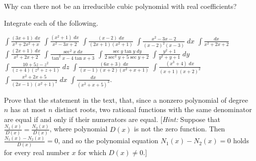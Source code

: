\begin{exercises}
Why can there not be an irreducible cubic
polynomial with real coefficients?

Integrate each of the following.
\begin{exenum}
\x
$\int \frac{(3x+1)\;dx}{x^3+2x^2+x}$
\x
$\int \frac{(x^2+1)\;dx}{x^2-3x+2}$
\x
$\int \frac{(x-2)\;dx}{(2x+1)(x^2+1)}$
\x
$\int \frac{x^2-3x-2}{(x-2)^2(x-3)}\;dx$
\x
$\int \frac{dx}{x^2+2x+2}$
\x
$\int \frac{(2x+1)\;dx}{x^2+2x+2}$
\x
$\int \frac{\sec^2x\;dx}{\tan^2x-4\tan x+3}$
\x
$\int \frac{\sec y \tan y \; dy}{2\sec^2y+5\sec y+2}$
\x
$\int \frac{y^2+1}{y^2+y+1}\;dy$
\x
$\int \frac{10+5z-z^2}{(z+4)(z^2+z+1)}\;dz$
\x
$\int \frac{(6x+3)\;dx}{(x-1)(x+2)(x^2+x+1)}$
\x
$\int \frac{(x^3+4)\;dx}{(x+1)(x+2)^2}$
\x
$\int \frac{x^2+2x+5}{(2x-1)(x^2+1)^2}\;dx$
\x
$\int \frac{dx}{(x^2+x+5)^3}$.
\end{exenum}

Prove that the statement in the text,  that,
since a nonzero polynomial of degree $n$
has at most $n$ distinct roots, two rational
functions with the same denominator are
equal if and only if their numerators are equal.
[\emph{Hint:} Suppose that
$\frac{N_1(x)}{D(x)} = \frac{N_2(x)}{D(x)}$,
where polynomial $D(x)$ is not the zero function.
Then $\frac{N_1(x)-N_2(x)}{D(x)}=0$,
and so the polynomial equation
$N_1(x) - N_2(x) = 0$ holds for every real number
$x$ for which $D(x) \ne 0$.]

\end{exercises}
